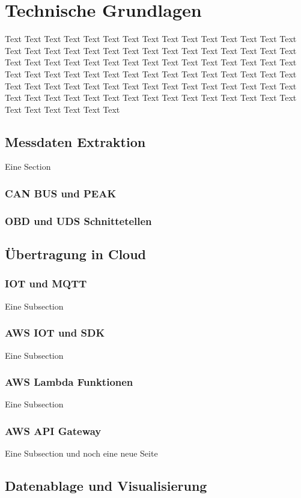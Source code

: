\chapter{Technische Grundlagen}
    Text Text Text Text Text Text Text Text Text Text Text Text Text Text Text Text Text Text Text Text Text Text Text Text 
    Text Text Text Text Text Text Text Text Text Text Text Text Text Text Text Text Text Text Text Text Text Text Text Text
    Text Text Text Text Text Text Text Text Text Text Text Text Text Text Text Text Text Text Text Text Text Text Text Text
    Text Text Text Text Text Text Text Text Text Text Text Text Text Text Text Text Text Text Text Text Text Text Text Text
    \section{Messdaten Extraktion}
        Eine Section
        \subsection{CAN BUS und PEAK}
        \subsection{OBD und UDS Schnittetellen}
        
    \section{Übertragung in Cloud}
		\subsection{IOT und MQTT}
        Eine Subsection
		\subsection{AWS IOT und SDK}
        Eine Subsection
		\subsection{AWS Lambda Funktionen}
        Eine Subsection
		\subsection{AWS API Gateway}
        Eine Subsection
		und noch eine neue Seite
        \newpage
	\section{Datenablage und Visualisierung}
